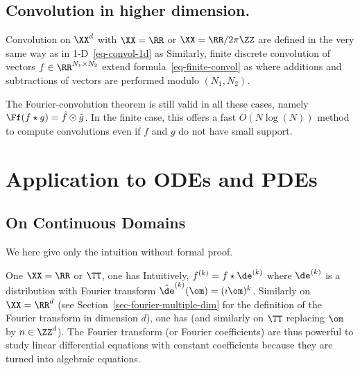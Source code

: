 \subsection{Convolution in higher dimension.}

Convolution on $\XX^d$ with $\XX=\RR$ or $\XX=\RR/2\pi\ZZ$ are defined in the very same way as in 1-D~\eqref{eq-convol-1d} as
Similarly, finite discrete convolution of vectors $f \in \RR^{N_1 \times N_2}$ extend formula~\eqref{eq-finite-convol} as
where additions and subtractions of vectors are performed modulo $(N_1,N_2)$.

The Fourier-convolution theorem is still valid in all these cases, namely $\Ff(f \star g)=\hat f \odot \hat g$. In the finite case, this offers a fast $O(N \log(N))$ method to compute convolutions even if $f$ and $g$ do not have small support.


\section{Application to ODEs and PDEs}
\label{sec-fourier-pdes}

\subsection{On Continuous Domains}

We here give only the intuition without formal proof.

One $\XX=\RR$ or $\TT$, one has
Intuitively, $f^{(k)} = f \star \de^{(k)}$ where $\de^{(k)}$ is a distribution with Fourier transform $\hat \de^{(k)}(\om) = (\imath \om)^k$. 
%
Similarly on $\XX=\RR^d$ (see Section~\ref{sec-fourier-multiple-dim} for the definition of the Fourier transform in dimension $d$), one has
(and similarly on $\TT$ replacing $\om$ by $n \in \ZZ^d$).
%
The Fourier transform (or Fourier coefficients) are thus powerful to study linear differential equations with constant coefficients because they are turned into algebraic equations.


